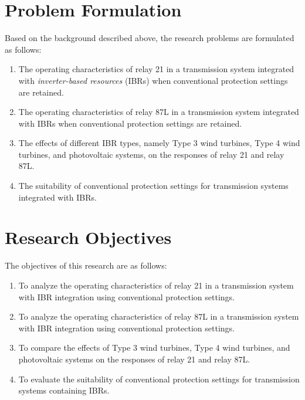 \section{Problem Formulation}

Based on the background described above, the research problems are formulated as follows:

\begin{enumerate}
	\item The operating characteristics of relay 21 in a transmission system integrated with \textit{inverter-based resources} (IBRs) when conventional protection settings are retained.
	\item The operating characteristics of relay 87L in a transmission system integrated with IBRs when conventional protection settings are retained.
	\item The effects of different IBR types, namely Type 3 wind turbines, Type 4 wind turbines, and photovoltaic systems, on the responses of relay 21 and relay 87L.
	\item The suitability of conventional protection settings for transmission systems integrated with IBRs.

\end{enumerate}

\section{Research Objectives}

The objectives of this research are as follows:

\begin{enumerate}
	\item To analyze the operating characteristics of relay 21 in a transmission system with IBR integration using conventional protection settings.
	\item To analyze the operating characteristics of relay 87L in a transmission system with IBR integration using conventional protection settings.
	\item To compare the effects of Type 3 wind turbines, Type 4 wind turbines, and photovoltaic systems on the responses of relay 21 and relay 87L.
	\item To evaluate the suitability of conventional protection settings for transmission systems containing IBRs.
\end{enumerate}

